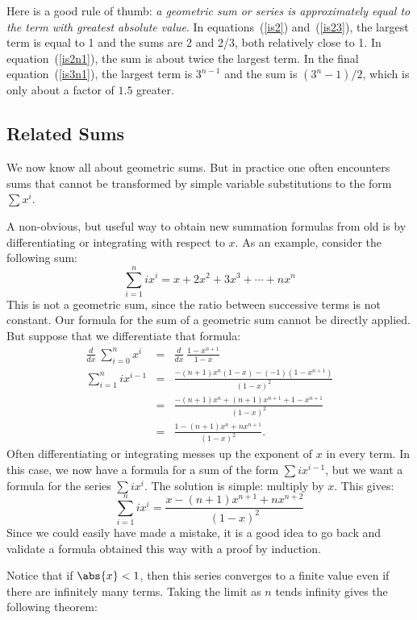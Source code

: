 Here is a good rule of thumb: {\em a geometric sum or series is
approximately equal to the term with greatest absolute value}.  In
equations~(\ref{is2}) and~(\ref{is23}), the largest term is equal to 1 and
the sums are 2 and 2/3, both relatively close to 1.  In
equation~(\ref{is2n1}), the sum is about twice the largest term.  In the
final equation~(\ref{is3n1}), the largest term is $3^{n-1}$ and the sum is
$(3^n-1)/2$, which is only about a factor of $1.5$ greater.


\subsection{Related Sums}

We now know all about geometric sums.  But in practice one often
encounters sums that cannot be transformed by simple variable
substitutions to the form $\sum x^i$.

A non-obvious, but useful way to obtain new summation formulas from
old is by differentiating or integrating with respect to $x$.  As an
example, consider the following sum:
\[
\sum_{i=1}^n i x^i = x + 2 x^2 + 3 x^3 + \cdots + n x^n
\]
This is not a geometric sum, since the ratio between successive
terms is not constant.  Our formula for the sum of a geometric sum
cannot be directly applied.  But suppose that we differentiate that
formula:
\begin{eqnarray*}
\frac{d}{dx} \ \sum_{i=0}^{n} x^i
  & = & \frac{d}{dx} \ \frac{1 - x^{n+1}}{1 - x} \\
\sum_{i=1}^{n} i x^{i-1}
 & = & \frac{-(n+1)x^n (1-x) - (-1)(1-x^{n+1})}{(1 - x)^2} \\
 & = & \frac{-(n+1)x^n + (n+1)x^{n+1} + 1 - x^{n+1}}{(1 - x)^2} \\
 & = & \frac{1 - (n+1)x^n + n x^{n+1}}{(1 - x)^2}.
\end{eqnarray*}
Often differentiating or integrating messes up the exponent of $x$ in
every term.  In this case, we now have a formula for a sum of the
form $\sum i x^{i-1}$, but we want a formula for the series $\sum i
x^i$.  The solution is simple: multiply by $x$.  This gives:
\[
\sum_{i=1}^{n} i x^i = \frac{x - (n+1)x^{n+1} + n x^{n+2}}{(1 - x)^2}
\]
Since we could easily have made a mistake, it is a good idea to go
back and validate a formula obtained this way with a proof by
induction.

Notice that if $\abs{x} < 1$, then this series converges to a finite value
even if there are infinitely many terms.  Taking the limit as $n$ tends
infinity gives the following theorem:

